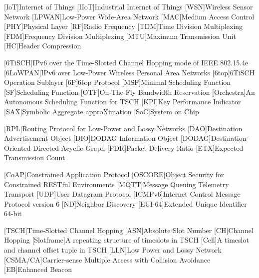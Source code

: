 \begin{acronym}
        [IoT]{Internet of Things}
        [IIoT]{Industrial Internet of Things}
        [WSN]{Wireless Sensor Network}
        [LPWAN]{Low-Power Wide-Area Network}
        [MAC]{Medium Access Control}
        [PHY]{Physical Layer}
        [RF]{Radio Frequency}
        [TDM]{Time Division Multiplexing}
        [FDM]{Frequency Division Multiplexing}
        [MTU]{Maximum Transmission Unit}
        [HC]{Header Compression}


    
        [6TiSCH]{IPv6 over the Time-Slotted Channel Hopping mode of IEEE 802.15.4e}
        [6LoWPAN]{IPv6 over Low-Power Wireless Personal Area Networks}
        [6top]{6TiSCH Operation Sublayer}
        [6P]{6top Protocol}
        [MSF]{Minimal Scheduling Function}
        [SF]{Scheduling Function}
        [OTF]{On-The-Fly Bandwidth Reservation}
        [Orchestra]{An Autonomous Scheduling Function for TSCH}
        [KPI]{Key Performance Indicator}
        [SAX]{Symbolic Aggregate approXimation}
        [SoC]{System on Chip}
    
        [RPL]{Routing Protocol for Low-Power and Lossy Networks}
        [DAO]{Destination Advertisement Object}
        [DIO]{DODAG Information Object}
        [DODAG]{Destination-Oriented Directed Acyclic Graph}
        [PDR]{Packet Delivery Ratio}
        [ETX]{Expected Transmission Count}
    
        [CoAP]{Constrained Application Protocol}
        [OSCORE]{Object Security for Constrained RESTful Environments}
        [MQTT]{Message Queuing Telemetry Transport}
        [UDP]{User Datagram Protocol}
        [ICMPv6]{Internet Control Message Protocol version 6}
        [ND]{Neighbor Discovery}
        [EUI-64]{Extended Unique Identifier 64-bit}
    
        [TSCH]{Time-Slotted Channel Hopping}
        [ASN]{Absolute Slot Number}
        [CH]{Channel Hopping}
        [Slotframe]{A repeating structure of timeslots in TSCH}
        [Cell]{A timeslot and channel offset tuple in TSCH}
        [LLN]{Low Power and Lossy Network}
        [CSMA/CA]{Carrier-sense Multiple Access with Collision Avoidance}
        [EB]{Enhanced Beacon}



\end{acronym}
